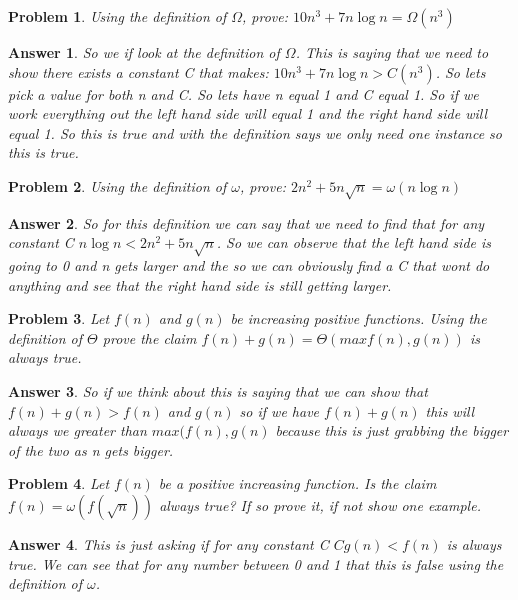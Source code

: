 \documentclass[11pt]{article}
\newtheorem{problem}{Problem}
\newtheorem{answer}{Answer}
\begin{document}
\bigskip

\begin{problem}
\label{prob:4}
 Using the definition of $\Omega$, prove: $10n^3 + 7n\log{n} = \Omega(n^3)$ 
\end{problem}

\begin{answer}
\label{ans:4}
 So we if look at the definition of $\Omega$. This is saying that we need to show there exists a constant C that makes: $10n^3 + 7n\log{n} > C(n^3)$. So lets pick a value for both n and C. So lets have n equal 1 and C equal 1. So if we work everything out the left hand side will equal 1 and the right hand side will equal 1. So this is true and with the definition says we only need one instance so this is true. 
\end{answer}

\bigskip

\begin{problem}
\label{prob:5}
 Using the definition of $\omega$, prove: $2n^2 + 5n\sqrt{n} = \omega(n\log{n})$
\end{problem}

\begin{answer}
\label{ans:5}
 So for this definition we can say that we need to find that for any constant C $n\log{n} < 2n^2 + 5n\sqrt{n}$. So we can observe that the left hand side is going to 0 and n gets larger and the so we can obviously find a C that wont do anything and see that the right hand side is still getting larger.
\end{answer}

\bigskip

\begin{problem}
\label{prob:6}
 Let $f(n)$ and $g(n)$ be increasing positive functions. Using the definition of $\Theta$ prove the claim $f(n) + g(n) = \Theta(max{f(n), g(n)})$ is always true.
\end{problem}

\begin{answer}
\label{ans:6}
 So if we think about this is saying that we can show that $f(n) + g(n) > f(n)$ and $g(n)$ so if we have $f(n) + g(n)$ this will always we greater than $max(f(n), g(n)$ because this is just grabbing the bigger of the two as n gets bigger.
\end{answer}

\bigskip

\begin{problem}
\label{prob:7}
 Let $f(n)$ be a positive increasing function. Is the claim $f(n) = \omega(f(\sqrt{n}))$ always true? If so prove it, if not show one example.
\end{problem}

\begin{answer}
\label{ans:7}
 This is just asking if for any constant C $Cg(n) < f(n)$ is always true. We can see that for any number between 0 and 1 that this is false using the definition of $\omega$.
\end{answer}
\end{document}
